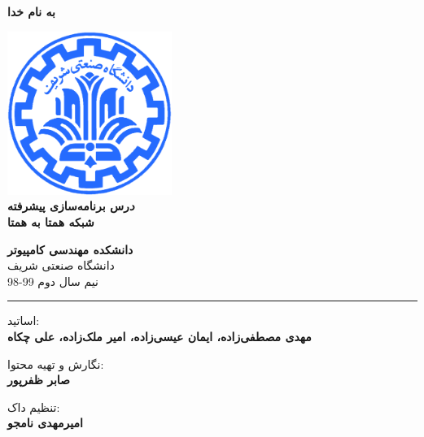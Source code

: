 \documentclass[]{article}
\begin{document}
\begin{titlepage}
\begin{center}

\textbf{ \Huge{به نام خدا} }
        
\vspace{0.2cm}

\includegraphics[width=0.4\textwidth]{sharif1.png}\\
\vspace{0.2cm}
\textbf{ \Huge{\emph درس برنامه‌سازی پیشرفته} }\\
\vspace{0.25cm}
\textbf{ \Large{ شبکه همتا به همتا } }
\vspace{0.2cm}
       
 
      \large \textbf{دانشکده مهندسی کامپیوتر}\\\vspace{0.1cm}
    \large   دانشگاه صنعتی شریف\\\vspace{0.2cm}
       \large   ﻧﯿﻢ سال دوم 99-98 \\\vspace{0.10cm}
      \noindent\rule[1ex]{\linewidth}{1pt}
اساتید:\\
    \textbf{{مهدی مصطفی‌زاده، ایمان عیسی‌زاده، امیر ملک‌زاده، علی چکاه}}



        \vspace{0.10cm}
نگارش و تهیه محتوا:\\
    \textbf{{صابر ظفرپور}}
    
       \vspace{0.10cm}
       تنظیم داک:\\
    \textbf{{امیرمهدی نامجو}}

    
        \vspace{0.05cm}

\end{center}
\end{titlepage}
\end{document}
